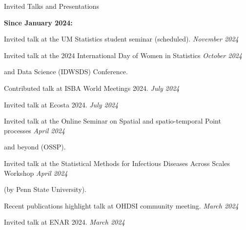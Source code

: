 \documentclass{resume} %
\begin{document}
\begin{rSection}{Invited Talks and Presentations}
	
	\hspace{-.2in} {\textbf{Since January 2024:}}
	
	
	Invited talk at the UM Statistics student seminar (scheduled).  \hfill {\em November 2024} 
	
	Invited talk at the 2024 International Day of Women  in Statistics 
	 \hfill {\em October 2024} 
	 
	\vspace{-0.1in} 
	and Data Science (IDWSDS) Conference. 
	
	Contributed talk at ISBA World Meetings 2024.  \hfill {\em July 2024}
	
	Invited talk at Ecosta 2024.  \hfill {\em July 2024}
	
	Invited talk at the Online Seminar on Spatial and spatio-temporal Point processes   \hfill {\em April 2024}
	
	\vspace{-0.1in} 
	and beyond (OSSP).
	
	Invited talk at the Statistical Methods for Infectious Diseases Across Scales Workshop \hfill {\em April 2024}
	
	\vspace{-0.1in}
	(by Penn State University).
	
	Recent publications highlight talk at OHDSI community meeting. \hfill {\em March 2024}
	
	Invited talk at ENAR 2024.  \hfill {\em March 2024}
	

\end{rSection}
\end{document}
